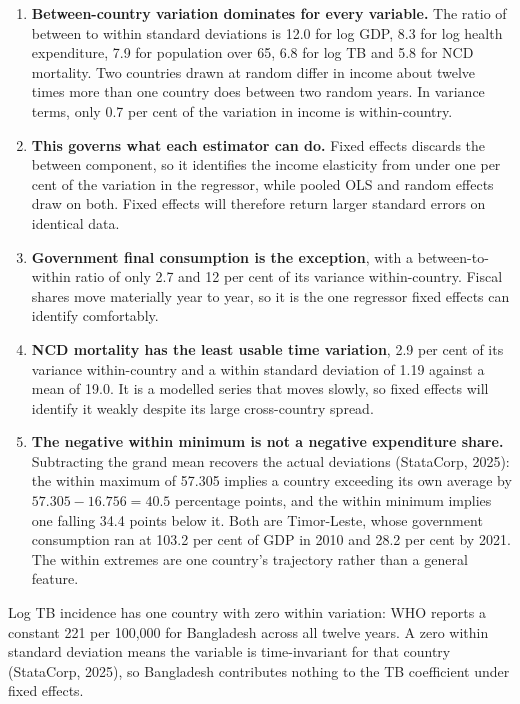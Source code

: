 \documentclass[11pt,a4paper]{article}
\begin{document}
\begin{enumerate}
  \item \textbf{Between-country variation dominates for every variable.} The
        ratio of between to within standard deviations is 12.0 for log GDP, 8.3
        for log health expenditure, 7.9 for population over 65, 6.8 for log TB
        and 5.8 for NCD mortality. Two countries drawn at random differ in
        income about twelve times more than one country does between two random
        years. In variance terms, only 0.7 per cent of the variation in income
        is within-country.

  \item \textbf{This governs what each estimator can do.} Fixed effects discards
        the between component, so it identifies the income elasticity from under
        one per cent of the variation in the regressor, while pooled OLS and
        random effects draw on both. Fixed effects will therefore return larger
        standard errors on identical data.

  \item \textbf{Government final consumption is the exception}, with a
        between-to-within ratio of only 2.7 and 12 per cent of its variance
        within-country. Fiscal shares move materially year to year, so it is the
        one regressor fixed effects can identify comfortably.

  \item \textbf{NCD mortality has the least usable time variation}, 2.9 per cent
        of its variance within-country and a within standard deviation of 1.19
        against a mean of 19.0. It is a modelled series that moves slowly, so
        fixed effects will identify it weakly despite its large cross-country
        spread.

  \item \textbf{The negative within minimum is not a negative expenditure
        share.} Subtracting the grand mean recovers the actual deviations
        (StataCorp, 2025): the within maximum of 57.305 implies a
        country exceeding its own average by $57.305 - 16.756 = 40.5$ percentage
        points, and the within minimum implies one falling 34.4 points below it.
        Both are Timor-Leste, whose government consumption ran at 103.2 per cent
        of GDP in 2010 and 28.2 per cent by 2021. The within extremes are one
        country's trajectory rather than a general feature.
\end{enumerate}

Log TB incidence has one country with zero within variation: WHO reports a
constant 221 per 100,000 for Bangladesh across all twelve years. A zero within
standard deviation means the variable is time-invariant for that country
(StataCorp, 2025), so Bangladesh contributes nothing to the TB coefficient under
fixed effects.
\end{document}

